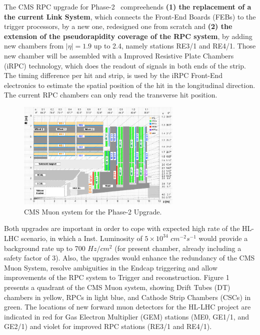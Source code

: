 The CMS RPC upgrade for Phase-2~\cite{muon_tdr} compreehends \textbf{(1) the replacement of a the current Link System}, which connects the Front-End Boards (FEBs) to the trigger processors, by a new one, redesigned one from scratch and \textbf{(2) the extension of the pseudorapidity coverage of the RPC system}, by adding new chambers from $|\eta| = 1.9$ up to 2.4, namely stations RE3/1 and RE4/1. Those new chamber will be assembled with a Improved Resistive Plate Chambers (iRPC) technology, which does the readout of signals in both ends of the strip. The timing difference per hit and strip, is used by the iRPC Front-End electronics to estimate the spatial position of the hit in the longitudinal direction. The current RPC chambers can only read the transverse hit position.

\begin{figure}
    \includegraphics[width=0.70\textwidth]{uioposter-images/cms_muon}
    \caption{\footnotesize CMS Muon system for the Phase-2 Upgrade.}
    \label{cms_muon_upgrade}
\end{figure}


Both upgrades are important in order to cope with expected high rate of the HL-LHC scenario, in which a Inst. Luminosity of $5 \times 10^{34}$ $cm^{-2}s^{-1}$ would provide a background rate up to 700 $Hz/cm^2$ (for present chamber, already including a safety factor of 3). Also, the upgrades would enhance the redundancy of the CMS Muon System, resolve ambiguities in the Endcap triggering and allow improvements of the RPC system to Trigger and reconstruction. Figure 1 presents a quadrant of the CMS Muon system, showing Drift Tubes (DT) chambers in yellow, RPCs in light blue, and Cathode Strip Chambers (CSCs) in green. The locations of new forward muon detectors for the HL-LHC project are indicated in red for Gas Electron Multiplier (GEM) stations (ME0, GE1/1, and GE2/1) and violet for improved RPC stations (RE3/1 and RE4/1).

